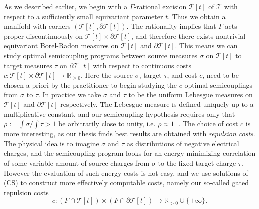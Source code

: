 \documentclass[12pt]{amsart}
\theoremstyle{definition}
\theoremstyle{remark}
\newcommand{\bR}{\mathbb{R}}
\newcommand{\del}{\partial}
\newcommand{\uF}{\underline{F}}
\newcommand{\sT}{\mathscr{T}}
\newcommand{\sZ}{\mathscr{Z}}
\begin{document}





As we described earlier, we begin with a $\Gamma$-rational excision $\sT[t]$ of $\sT$ with respect to a sufficiently small equivariant parameter $t$. Thus we obtain a manifold-with-corners $(\sT[t], \del \sT[t])$. The rationality implies that $\Gamma$ acts proper discontinuously on $\sT[t] \times \del \sT[t]$, and therefore there exists nontrivial equivariant Borel-Radon measures on $\sT[t]$ and $\del \sT[t]$. This means we can study optimal semicoupling programs between source measures $\sigma$ on $\sT[t]$ to target measures $\tau$ on $\del \sT[t]$ with respect to continuous costs $c:\sT[t] \times \del \sT[t] \to \bR_{\geq 0}$. Here the source $\sigma$, target $\tau$, and cost $c$, need to be chosen a priori by the practitioner to begin studying the $c$-optimal semicouplings from $\sigma$ to $\tau$. In practice we take $\sigma$ and $\tau$ to be the uniform Lebesgue measures on $\sT[t]$ and $\del \sT[t]$ respectively. The Lebesgue measure is defined uniquely up to a multiplicative constant, and our semicoupling hypothesis requires only that $\rho:=\int \sigma / \int \tau >1$ be arbitrarily close to unity, i.e. $\rho\approx 1^+$. The choice of cost $c$ is more interesting, as our thesis finds best results are obtained with \emph{repulsion costs}. The physical idea is to imagine $\sigma$ and $\tau$ as distributions of negative electrical charges, and the semicoupling program looks for an energy-minimizing correlation of some variable amount of source charges from $\sigma$ to the fixed target charge $\tau$. However the evaluation of such energy costs is not easy, and we use solutions of (CS) to construct more effectively computable costs, namely our so-called gated repulsion costs \begin{equation} \underline{c}:(\uF \cap \sT[t]) \times (\uF \cap \del \sT[t])  \to \bR_{>0} \cup \{ +\infty \}. \label{gatedcost} \end{equation}
\end{document}
